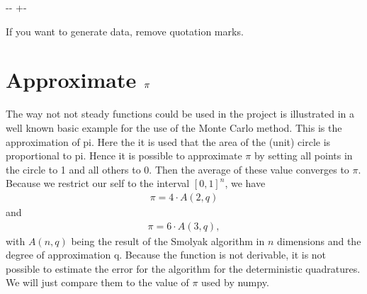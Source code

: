 \documentclass[letterpaper,10pt,english]{sphinxmanual}
\newlength\nbsphinxcodecellspacing
\begin{document}
{

\kern-\sphinxverbatimsmallskipamount\kern-\baselineskip
\kern+\FrameHeightAdjust\kern-\fboxrule
\vspace{\nbsphinxcodecellspacing}

\begin{sphinxVerbatim}[commandchars=\\\{\}]
If you want to generate data, remove quotation marks.
\end{sphinxVerbatim}
}

{
\begin{sphinxVerbatim}[commandchars=\\\{\}]
\llap{\color{nbsphinxin}[ ]:\,\hspace{\fboxrule}\hspace{\fboxsep}}
\end{sphinxVerbatim}
}


\chapter{Approximate \protect\(\pi\protect\)}
\label{\detokenize{examples/Approxim_pi:Approximate-_pi}}\label{\detokenize{examples/Approxim_pi::doc}}
The way not not steady functions could be used in the project is illustrated in a well known basic example for the use of the Monte Carlo method. This is the approximation of pi. Here the it is used that the area of the (unit) circle is proportional to pi. Hence it is possible to approximate \(\pi\) by setting all points in the circle to 1 and all others to 0. Then the average of these value converges to \(\pi\). Because we restrict our self to the interval \([0,1]^n\), we have
\begin{equation*}
\begin{split}\pi = 4 \cdot A(2,q)\end{split}
\end{equation*}
and
\begin{equation*}
\begin{split}\pi = 6 \cdot A(3,q),\end{split}
\end{equation*}
with \(A(n,q)\) being the result of the Smolyak algorithm in \(n\) dimensions and the degree of approximation q. Because the function is not derivable, it is not possible to estimate the error for the algorithm for the deterministic quadratures. We will just compare them to the value of \(\pi\) used by numpy.
\end{document}
